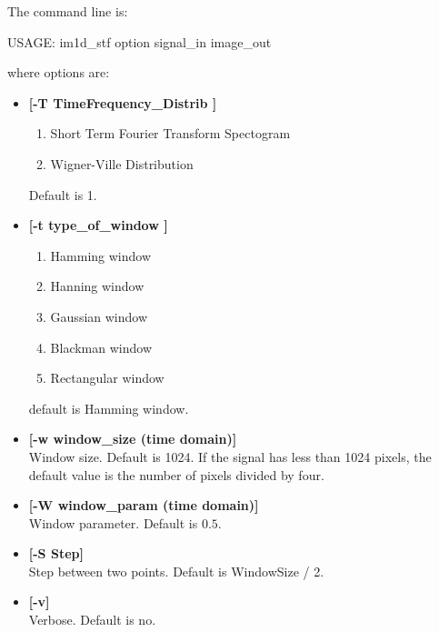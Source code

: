 \smallskip
The command line is:
{\bf
\begin{center}
 USAGE: im1d\_stf option signal\_in image\_out
\end{center}}
where options are:
\begin{itemize}
\baselineskip=0.4truecm
\item {\bf [-T TimeFrequency\_Distrib ]}
\begin{enumerate}
\itemsep=0.1truecm
\baselineskip=0.4truecm
\item Short Term Fourier Transform Spectogram 
\item Wigner-Ville Distribution
\end{enumerate}
Default is 1.
\item {\bf [-t type\_of\_window ]}
\begin{enumerate}
\itemsep=0.1truecm
\baselineskip=0.4truecm
\item Hamming window
\item Hanning window
\item Gaussian window
\item Blackman window
\item Rectangular window
\end{enumerate}
default is Hamming window.
\item {\bf [-w window\_size (time domain)]} \\
Window size. Default is 1024.
If the signal has less than 1024 pixels, the default value is
the number of pixels divided by four.
\item {\bf [-W window\_param (time domain)]} \\
 Window parameter. Default is $0.5$.
\item {\bf [-S Step]} \\
 Step between two points. Default is WindowSize / 2.
\item {\bf [-v]} \\
Verbose. Default is no.
\end{itemize}
